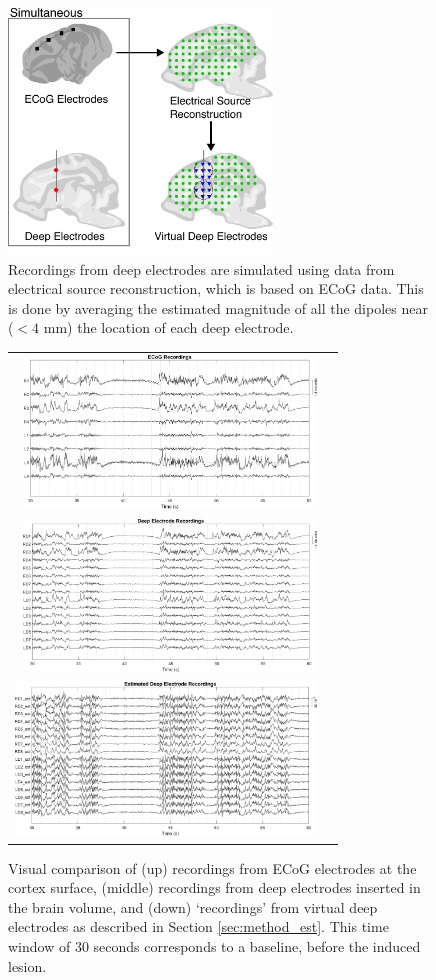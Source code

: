 \documentclass[draftcls, onecolumn, peerreview]{IEEEtran}
\begin{document}
\begin{figure}[!t]
\centering
\includegraphics[width=7cm]{./img/diagram_v2}
\caption{Recordings from deep electrodes are simulated using data from electrical source reconstruction, which is based on ECoG data. This is done by averaging the estimated magnitude of all the dipoles near ($<4$ mm) the location of each deep electrode.
}
\label{fig:raw}
\end{figure}

\begin{figure}[!t]
    \centering
    \begin{tabular}{rr}
    \includegraphics[width=7.75cm]{./img/ctrl_ecog} \\
    \includegraphics[width=7.8cm ]{./img/ctrl_seeg} \\
    \includegraphics[width=8cm   ]{./img/ctrl_estim}
    \end{tabular}
\caption{Visual comparison of (up) recordings from ECoG electrodes at the cortex surface, (middle) recordings from deep electrodes inserted in the brain volume, and (down) `recordings' from virtual deep electrodes as described in Section \ref{sec:method_est}. This time window of 30 seconds corresponds to a baseline, before the induced lesion.}
    \label{fig:control}
\end{figure}
\end{document}
